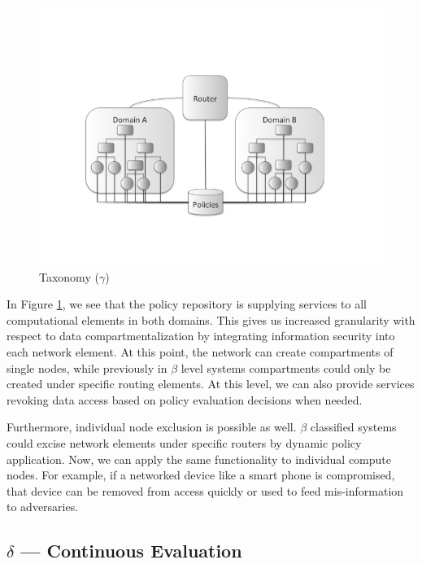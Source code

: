 \documentclass[12pt,letterpaper]{article}
\begin{document}
\begin{figure}[!t]
\centering
\includegraphics[width=5in]{model-gamma}
\caption{Taxonomy ($\gamma$)}
\label{fig:model:taxonomy-gamma}
\end{figure}

In Figure \ref{fig:model:taxonomy-gamma}, we see that the policy repository is supplying services to all computational elements in both domains.  This gives us increased granularity with respect to data compartmentalization by integrating information security into each network element.  At this point, the network can create compartments of single nodes, while previously in $\beta$ level systems compartments could only be created under specific routing elements.  At this level, we can also provide services revoking data access based on policy evaluation decisions when needed.

Furthermore, individual node exclusion is possible as well. $\beta$ classified systems could excise network elements under specific routers by dynamic policy application.  Now, we can apply the same functionality to individual compute nodes.  For example, if a networked device like a smart phone is compromised, that device can be removed from access quickly or used to feed mis-information to adversaries.

\subsection{$\delta$ --- Continuous Evaluation}

\end{document}
